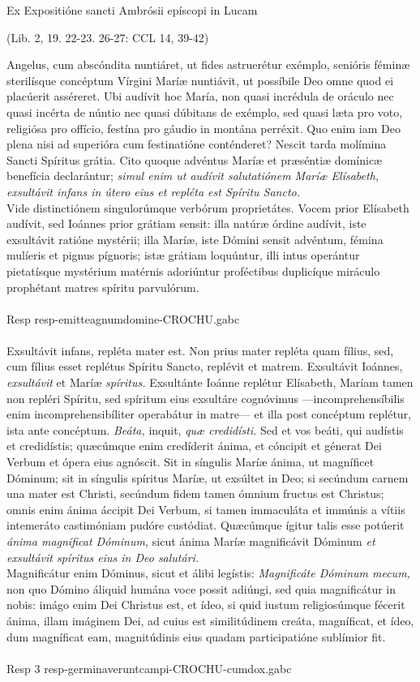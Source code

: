 \documentclass[options]{article}
\begin{document}
	Ex Expositióne sancti Ambrósii epíscopi in Lucam
	\begin{flushright}
		(Lib. 2, 19. 22-23. 26-27: CCL 14, 39-42)	
	\end{flushright}
	Angelus, cum abscóndita nuntiáret, ut fides astruerétur exémplo, senióris féminæ sterilísque concéptum Vírgini Maríæ nuntiávit, ut possíbile Deo omne quod ei placúerit asséreret.
	Ubi audívit hoc María, non quasi incrédula de oráculo nec quasi incérta de núntio nec quasi dúbitans de exémplo, sed quasi læta pro voto, religiósa pro offício, festína pro gáudio in montána perréxit.
	Quo enim iam Deo plena nisi ad superióra cum festinatióne conténderet? Nescit tarda molímina Sancti Spíritus grátia. Cito quoque advéntus Maríæ et præséntiæ domínicæ benefícia declarántur; \emph{simul enim ut audívit salutatiónem Maríæ Elísabeth, exsultávit infans in útero eius et repléta est Spíritu Sancto.}\\
	Vide distinctiónem singulorúmque verbórum proprietátes. Vocem prior Elísabeth audívit, sed Ioánnes prior grátiam sensit: illa natúræ órdine audívit, iste exsultávit ratióne mystérii; illa Maríæ, iste Dómini sensit advéntum, fémina mulíeris et pignus pígnoris; istæ grátiam loquúntur, illi intus operántur pietatísque mystérium matérnis adoriúntur proféctibus duplicíque miráculo prophétant matres spíritu parvulórum.\\
	\\
	Resp  resp-emitteagnumdomine-CROCHU.gabc\\
	\\
	Exsultávit infans, repléta mater est. Non prius mater repléta quam fílius, sed, cum fílius esset replétus Spíritu Sancto, replévit et matrem. Exsultávit Ioánnes, \emph{exsultávit} et Maríæ \emph{spíritus.} Exsultánte Ioánne replétur Elísabeth, Maríam tamen non repléri Spíritu, sed spíritum eius exsultáre cognóvimus —incomprehensíbilis enim incomprehensibíliter operabátur in matre— et illa post concéptum replétur, ista ante concéptum. \emph{Beáta,} inquit, \emph{quæ credidísti.}
	Sed et vos beáti, qui audístis et credidístis; quæcúmque enim credíderit ánima, et cóncipit et génerat Dei Verbum et ópera eius agnóscit.
	Sit in síngulis Maríæ ánima, ut magníficet Dóminum; sit in síngulis spíritus Maríæ, ut exsúltet in Deo; si secúndum carnem una mater est Christi, secúndum fidem tamen ómnium fructus est Christus; omnis enim ánima áccipit Dei Verbum, si tamen immaculáta et immúnis a vítiis intemeráto castimóniam pudóre custódiat.
	Quæcúmque ígitur talis esse potúerit \emph{ánima magníficat Dóminum,} sicut ánima Maríæ magnificávit Dóminum \emph{et exsultávit spíritus eius in Deo salutári.}\\
	Magnificátur enim Dóminus, sicut et álibi legístis: \emph{Magnificáte Dóminum mecum,} non quo Dómino áliquid humána voce possit adiúngi, sed quia magnificátur in nobis: imágo enim Dei Christus est, et ídeo, si quid iustum religiosúmque fécerit ánima, illam imáginem Dei, ad cuius est similitúdinem creáta, magníficat, et ídeo, dum magníficat eam, magnitúdinis eius quadam participatióne sublímior fit. \\
	\\
	Resp 3   resp-germinaveruntcampi-CROCHU-cumdox.gabc
\end{document}
